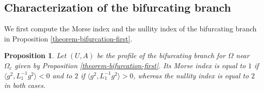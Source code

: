 \documentclass[12pt,reqno]{amsart}
\numberwithin{equation}{section}
\newtheorem{proposition}{Proposition}
\begin{document}
\subsection{Characterization of the bifurcating branch}

We first compute the Morse index and the nullity index of the bifurcating branch 
in Proposition \ref{theorem-bifurcation-first}. 

\begin{proposition}
    \label{theorem-Morse-first}
    Let $(U,A)$ be the profile of the bifurcating branch for $\Omega$ near $\Omega_c$ given by Proposition \ref{theorem-bifurcation-first}. 
Its Morse index is equal to $1$ if $\langle g^2, L_1^{-1} g^2 \rangle < 0$ and to $2$ if $\langle g^2, L_1^{-1} g^2 \rangle > 0$, 
    whereas the nullity index is equal to $2$ in both cases. 
\end{proposition}
\end{document}
